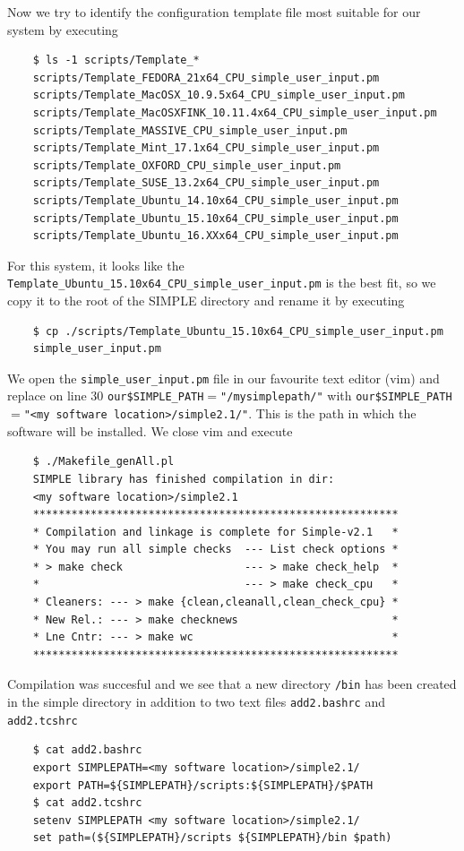 \documentclass[a4paper,11pt]{article}
\begin{document}
Now we try to identify the configuration template file most suitable for our system by executing
\begin{verbatim}
    $ ls -1 scripts/Template_*
    scripts/Template_FEDORA_21x64_CPU_simple_user_input.pm
    scripts/Template_MacOSX_10.9.5x64_CPU_simple_user_input.pm
    scripts/Template_MacOSXFINK_10.11.4x64_CPU_simple_user_input.pm
    scripts/Template_MASSIVE_CPU_simple_user_input.pm
    scripts/Template_Mint_17.1x64_CPU_simple_user_input.pm
    scripts/Template_OXFORD_CPU_simple_user_input.pm
    scripts/Template_SUSE_13.2x64_CPU_simple_user_input.pm
    scripts/Template_Ubuntu_14.10x64_CPU_simple_user_input.pm
    scripts/Template_Ubuntu_15.10x64_CPU_simple_user_input.pm
    scripts/Template_Ubuntu_16.XXx64_CPU_simple_user_input.pm
\end{verbatim}

For this system, it looks like the \texttt{Template\_Ubuntu\_15.10x64\_CPU\_simple\_user\_input.pm} is the best fit, so we copy it to the root of the SIMPLE directory and rename it by executing
\begin{verbatim}
    $ cp ./scripts/Template_Ubuntu_15.10x64_CPU_simple_user_input.pm
    simple_user_input.pm
\end{verbatim}

We open the \texttt{simple\_user\_input.pm} file in our favourite text editor (vim) and replace on line 30 \texttt{our\$SIMPLE\_PATH$=$"/mysimplepath/"} with \texttt{our\$SIMPLE\_PATH$=$"<my software location>/simple2.1/"}. This is the path in which the software will be installed. We close vim and execute
\begin{verbatim}
    $ ./Makefile_genAll.pl
    SIMPLE library has finished compilation in dir:
    <my software location>/simple2.1
    *********************************************************
    * Compilation and linkage is complete for Simple-v2.1   *
    * You may run all simple checks  --- List check options *
    * > make check                   --- > make check_help  *
    *                                --- > make check_cpu   *
    * Cleaners: --- > make {clean,cleanall,clean_check_cpu} *
    * New Rel.: --- > make checknews                        *
    * Lne Cntr: --- > make wc                               *
    *********************************************************
\end{verbatim}

Compilation was succesful and we see that a new directory \texttt{/bin} has been created in the simple directory in addition to two text files \texttt{add2.bashrc} and \texttt{add2.tcshrc}
\begin{verbatim}
    $ cat add2.bashrc
    export SIMPLEPATH=<my software location>/simple2.1/
    export PATH=${SIMPLEPATH}/scripts:${SIMPLEPATH}/$PATH
    $ cat add2.tcshrc
    setenv SIMPLEPATH <my software location>/simple2.1/
    set path=(${SIMPLEPATH}/scripts ${SIMPLEPATH}/bin $path)
\end{verbatim}
\end{document}
